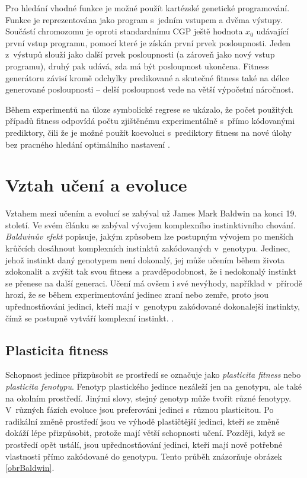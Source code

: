 Pro hledání vhodné funkce je možné použít kartézské genetické programování. Funkce je reprezentována jako program s~jedním vstupem a dvěma výstupy. Součástí chromozomu je oproti standardnímu CGP ještě hodnota $x_0$ udávající první vstup programu, pomocí které je získán první prvek posloupnosti. Jeden z~výstupů slouží jako další prvek posloupnosti (a zároveň jako nový vstup programu), druhý pak udává, zda má být posloupnost ukončena. Fitness generátoru závisí kromě odchylky predikované a skutečné fitness také na délce generované posloupnosti -- delší posloupnost vede na větší výpočetní náročnost.

Během experimentů na úloze symbolické regrese se ukázalo, že počet použitých případů fitness odpovídá počtu zjištěnému experimentálně s~přímo kódovanými prediktory, čili že je možné použít koevoluci s~prediktory fitness na nové úlohy bez pracného hledání optimálního nastavení \cite{Siku2015}.


\section{Vztah učení a evoluce}
\label{secColearning}

Vztahem mezi učením a evolucí se zabýval už James Mark Baldwin na konci 19. století. Ve svém článku \cite{Baldwin} se zabýval vývojem komplexního instinktivního chování. \emph{Baldwinův efekt} popisuje, jakým způsobem lze postupným vývojem po menších krůčcích dosáhnout komplexních instinktů zakódovaných v~genotypu. Jedinec, jehož instinkt daný genotypem není dokonalý, jej může učením během života zdokonalit a zvýšit tak svou fitness a pravděpodobnost, že i nedokonalý instinkt se přenese na další generaci. Učení má ovšem i své nevýhody, například v~přírodě hrozí, že se během experimentování jedinec zraní nebo zemře, proto jsou upřednostňováni jedinci, kteří mají v~genotypu zakódované dokonalejší instinkty, čímž se postupně vytváří komplexní instinkt. \cite{HowToShiftBias}.

\subsection{Plasticita fitness}
\label{secPlasticity}

Schopnost jedince přizpůsobit se prostředí se označuje jako \emph{plasticita fitness} nebo \emph{plasticita fenotypu}. Fenotyp plastického jedince nezáleží jen na genotypu, ale také na okolním prostředí. Jinými slovy, stejný genotyp může tvořit různé fenotypy. V~různých fázích evoluce jsou preferováni jedinci s~různou plasticitou. Po radikální změně prostředí jsou ve výhodě plastičtější jedinci, kteří se změně dokáží lépe přizpůsobit, protože mají větší schopnosti učení. Později, když se prostředí opět ustálí, jsou upřednostňování jedinci, kteří mají nově potřebné vlastnosti přímo zakódované do genotypu. Tento průběh znázorňuje obrázek \ref{obrBaldwin}.

